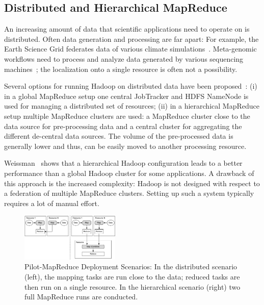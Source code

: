 \documentclass{acm_proc_article-sp}
\newcommand{\jhanote}[1]{ {\textcolor{red} { ***SJ: #1 }}}
\newcommand{\alnote}[1]{ {\textcolor{blue} { ***andreL: #1 }}}
\newcommand{\pnote}[1]{ {\textcolor{magenta} { ***pradeep: #1 }}}
\newcommand{\alnote}[1]{}
\newcommand{\pnote}[1]{}
\newcommand{\jhanote}[1]{}
\newcommand{\upp}{\vspace*{-0.5em}}
\newcommand{\pilotmapreduce}{Pilot-MapReduce\xspace}
\begin{document}
\upp
\subsection{Distributed and Hierarchical MapReduce}
\label{sec:pmr-distributed}%

An increasing amount of data that scientific applications need to
operate on is distributed. Often data generation
and processing are far apart: For example, the Earth Science Grid
federates data of various climate simulations~\cite{ESG}. Meta-genomic
workflows need to process and analyze data generated by various
sequencing machines~\cite{Jha:2011fk}; the localization onto a single
resource is often not a possibility.

Several options for running Hadoop on distributed data have been
proposed~\cite{weissman-mr-11}: (i) in a global MapReduce setup one
central JobTracker and HDFS NameNode is used for managing a
distributed set of resources; (ii) in a hierarchical MapReduce setup
multiple MapReduce clusters are used: a MapReduce cluster close to the
data source for pre-processing data and a central cluster for
aggregating the different de-central data sources. The volume of the
pre-processed data is generally lower and thus, can be easily moved to
another processing resource. 

Weissman~\cite{weissman-mr-11} shows that a hierarchical Hadoop
configuration leads to a better performance than a global Hadoop
cluster for some applications. A drawback of this approach is the
increased complexity: Hadoop is not designed with respect to a
federation of multiple MapReduce clusters. Setting up such a
system typically requires a lot of manual effort.  


  


\begin{figure}
	\upp
	\centering
	\includegraphics[width=0.42\textwidth]{figures/distributed_hierachical.pdf}
	\caption{\pilotmapreduce Deployment Scenarios: In the
          distributed scenario (left), the mapping tasks are run close
          to the data; reduced tasks are then run on a single
          resource. In the hierarchical scenario (right) two full
          MapReduce runs are
          conducted. \label{fid:distributed-mapreduce-overview}\upp\upp}
\end{figure}
\end{document}
